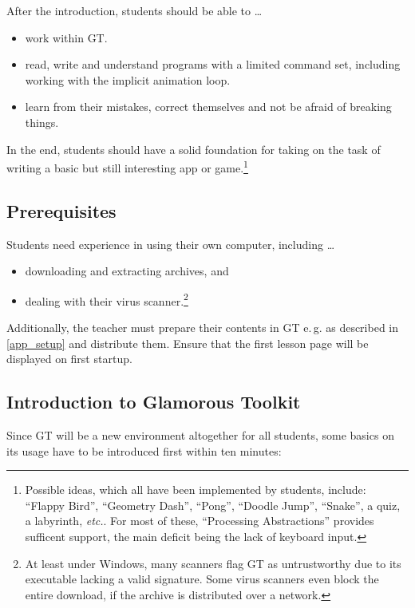 After the introduction, students should be able to \dots
\begin{itemize}
\item work within \ac{GT}.
\item read, write and understand programs with a limited command set, including working with the implicit animation loop.
\item learn from their mistakes, correct themselves and not be afraid of breaking things.
\end{itemize}

In the end, students should have a solid foundation for taking on the task of writing a basic but still interesting app or game.\footnote{Possible ideas, which all have been implemented by students, include: ``Flappy Bird'', ``Geometry Dash'', ``Pong'', ``Doodle Jump'', ``Snake'', a quiz, a labyrinth, \emph{etc.}. For most of these, ``Processing Abstractions'' provides sufficent support, the main deficit being the lack of keyboard input.}


\subsection{Prerequisites}

Students need experience in using their own computer, including \dots
\begin{itemize}
\item downloading and extracting archives, and
\item dealing with their virus scanner.\footnote{At least under Windows, many scanners flag \ac{GT} as untrustworthy due to its executable lacking a valid signature. Some virus scanners even block the entire download, if the archive is distributed over a network.}
\end{itemize}

Additionally, the teacher must prepare their contents in \ac{GT} e.\,g. as described in \ref{app_setup} and distribute them. Ensure that the first lesson page will be displayed on first startup.


\subsection{Introduction to Glamorous Toolkit} \label{ssc_lesson_gt}

Since \ac{GT} will be a new environment altogether for all students, some basics on its usage have to be introduced first within ten minutes:

